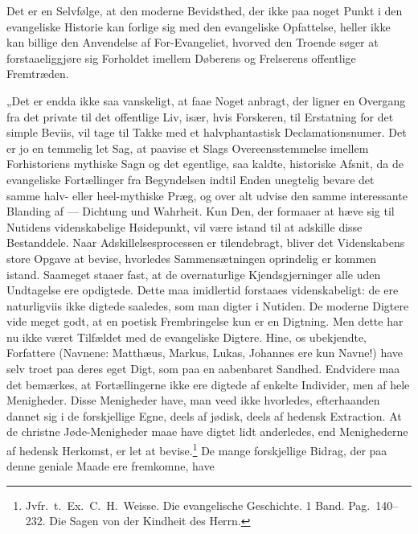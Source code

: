 \documentclass[12pt,a4paper]{book}
\begin{document}
Det er en Selvfølge, at den moderne Bevidsthed, der ikke paa noget Punkt i den
evangeliske Historie kan forlige sig med den evangeliske Opfattelse, heller ikke
kan billige den Anvendelse af For-Evangeliet, hvorved den Troende søger at
forstaaeliggjøre sig Forholdet imellem Døberens og Frelserens offentlige
Fremtræden.

„Det er endda ikke saa vanskeligt, at faae Noget anbragt, der ligner en Overgang
fra det private til det offentlige Liv, især, hvis Forskeren, til Erstatning for
det simple Beviis, vil tage til Takke med et halvphantastisk Declamationsnumer.
Det er jo en temmelig let Sag, at paavise et Slags Overeensstemmelse imellem
Forhistoriens mythiske Sagn og det egentlige, saa kaldte, historiske Afsnit, da
de evangeliske Fortællinger fra Begyndelsen indtil Enden unegtelig bevare det
samme halv- eller heel-mythiske Præg, og over\-%
alt udvise den samme interessante Blanding af --- Dichtung und Wahrheit.
Kun Den, der formaaer at hæve sig til Nutidens videnskabelige Høidepunkt, vil
være istand til at adskille disse Bestanddele. Naar Adskillelsesprocessen er
tilendebragt, bliver det Videnskabens store Opgave at bevise, hvorledes
Sammensætningen oprindelig er kommen istand. Saameget staaer fast, at de
overnaturlige Kjendsgjerninger alle uden Undtagelse ere opdigtede. Dette maa
imidlertid forstaaes videnskabeligt: de ere naturligviis ikke digtede saaledes,
som man digter i Nutiden. De moderne Digtere vide meget godt, at en poetisk
Frembringelse kun er en Digtning. Men dette har nu ikke været Tilfældet med de
evangeliske Digtere. Hine, os ubekjendte, Forfattere (Navnene: Matthæus, Markus,
Lukas, Johannes ere kun Navne!) have selv troet paa deres eget Digt, som paa en
aabenbaret Sandhed. Endvidere maa det bemærkes, at Fortællingerne ikke ere
digtede af enkelte Individer, men af hele Menigheder. Disse Menigheder have, man
veed ikke hvorledes, efterhaanden dannet sig i de forskjellige Egne, deels af
jødisk, deels af hedensk Extraction. At de christne Jøde-Menigheder maae have
digtet lidt anderledes, end Menighederne af hedensk Herkomst, er let at
bevise.\footnote{%
  Jvfr.\ t.\ Ex.\ C.\ H.\ Weisse. Die evangelische Geschichte. 1 Band. Pag.\
  140--232. Die Sagen von der Kindheit des Herrn.%
} De mange forskjellige Bidrag, der paa denne geniale Maade ere fremkomne, have
\end{document}
